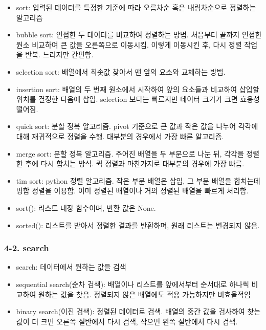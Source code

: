 \begin{itemize}
\tightlist
\item
  sort: 입력된 데이터를 특정한 기준에 따라 오름차순 혹은 내림차순으로
  정렬하는 알고리즘
\item
  bubble sort: 인접한 두 데이터를 비교하여 정렬하는 방법. 처음부터
  끝까지 인접한 원소 비교하여 큰 값을 오른쪽으로 이동시킴. 이렇게
  이동시킨 후, 다시 정렬 작업을 반복. 느리지만 간편함.
\item
  selection sort: 배열에서 최솟값 찾아서 맨 앞의 요소와 교체하는 방법.
\item
  insertion sort: 배열의 두 번째 원소에서 시작하여 앞의 요소들과
  비교하여 삽입할 위치를 결정한 다음에 삽입. selection 보다는 빠르지만
  데이터 크기가 크면 효용성 떨어짐.
\item
  quick sort: 분할 정복 알고리즘. pivot 기준으로 큰 값과 작은 값을
  나누어 각각에 대해 재귀적으로 정렬을 수행. 대부분의 경우에서 가장 빠른
  알고리즘.
\item
  merge sort: 분할 정복 알고리즘. 주어진 배열을 두 부분으로 나눈 뒤,
  각각을 정렬한 후에 다시 합치는 방식. 퀵 정렬과 마찬가지로 대부분의
  경우에 가장 빠름.
\item
  tim sort: python 정렬 알고리즘. 작은 부분 배열은 삽입, 그 부분 배열을
  합치는데 병합 정렬을 이용함. 이미 정렬된 배열이나 거의 정렬된 배열을
  빠르게 처리함.
\item
  sort(): 리스트 내장 함수이며, 반환 값은 None.
\item
  sorted(): 리스트를 받아서 정렬한 결과를 반환하며, 원래 리스트는
  변경되지 않음.
\end{itemize}

\hypertarget{search}{%
\subsubsection{4-2. search}\label{search}}

\begin{itemize}
\tightlist
\item
  search: 데이터에서 원하는 값을 검색
\item
  sequential search(순차 검색): 배열이나 리스트를 앞에서부터 순서대로
  하나씩 비교하여 원하는 값을 찾음. 정렬되지 않은 배열에도 적용
  가능하지만 비효율적임
\item
  binary search(이진 검색): 정렬된 데이터로 검색. 배열의 중간 값을
  검사하여 찾는 값이 더 크면 오른쪽 절반에서 다시 검색, 작으면 왼쪽
  절반에서 다시 검색.
\end{itemize}



